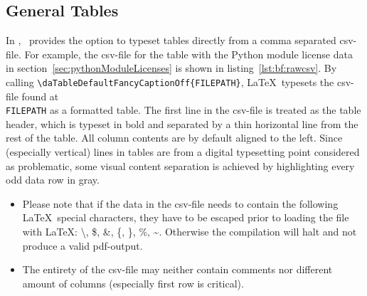	\subsection{General Tables}
		In \productVersion, \productName~provides the option to typeset tables directly from a comma separated csv-file. For example, the \mbox{csv-file} for the table with the Python module license data in \mbox{section \ref{sec:pythonModuleLicenses}} is shown in \mbox{listing \ref{lst:bf:rawcsv}}.
		\lstset{style=LaTeX}
		By calling \lstinline$\daTableDefaultFancyCaptionOff{FILEPATH}$, \LaTeX~typesets the \mbox{csv-file} found at\\ \lstinline$FILEPATH$ as a formatted table.
		The first line in the \mbox{csv-file} is treated as the table header, which is typeset in bold and separated by a thin horizontal line from the rest of the table. All column contents are by default aligned to the left. Since (especially vertical) lines in tables are from a digital typesetting point considered as problematic, some visual content separation is achieved by highlighting every odd data row in gray. 
		\begin{daWarningBox}
			\begin{itemize}[leftmargin=*]
				\setlength\itemsep{-0.1em}
				\item Please note that if the data in the \mbox{csv-file} needs to contain the following \LaTeX~special characters, they have to be escaped prior to loading the file with \LaTeX: {\ttfamily\small\textbackslash}, {\ttfamily\small\$}, {\ttfamily\small\&}, {\ttfamily\small\{}, {\ttfamily\small\}}, {\ttfamily\small\%}, {\ttfamily\small\textasciitilde}. Otherwise the compilation will halt and not produce a valid pdf-output.
				\item The entirety of the \mbox{csv-file} may neither contain comments nor different amount of columns (especially first row is critical). 
			\end{itemize}	
		\end{daWarningBox} 
